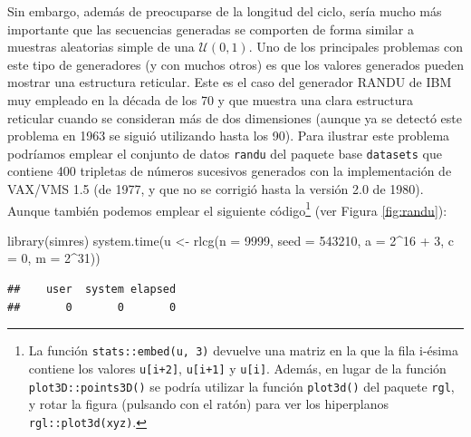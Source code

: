 \documentclass[
]{book}
\newenvironment{Shaded}{\begin{snugshade}}{\end{snugshade}}
\newcommand{\AttributeTok}[1]{\textcolor[rgb]{0.77,0.63,0.00}{#1}}
\newcommand{\DecValTok}[1]{\textcolor[rgb]{0.00,0.00,0.81}{#1}}
\newcommand{\FunctionTok}[1]{\textcolor[rgb]{0.00,0.00,0.00}{#1}}
\newcommand{\NormalTok}[1]{#1}
\newcommand{\OtherTok}[1]{\textcolor[rgb]{0.56,0.35,0.01}{#1}}
\newcommand{\SpecialCharTok}[1]{\textcolor[rgb]{0.00,0.00,0.00}{#1}}
\theoremstyle{break}
\theoremstyle{nonumberplain}
\begin{document}
Sin embargo, además de preocuparse de la longitud del ciclo, sería mucho más importante que las secuencias generadas se comporten de forma similar a muestras aleatorias simple de una \(\mathcal{U}(0,1)\).
Uno de los principales problemas con este tipo de generadores (y con muchos otros) es que los valores generados pueden mostrar una estructura reticular.
Este es el caso del generador RANDU de IBM muy empleado en la década de los 70 y que muestra una clara estructura reticular cuando se consideran más de dos dimensiones (aunque ya se detectó este problema en 1963 se siguió utilizando hasta los 90).
Para ilustrar este problema podríamos emplear el conjunto de datos \texttt{randu} del paquete base \texttt{datasets} que contiene 400 tripletas de números sucesivos generados con la implementación de VAX/VMS 1.5 (de 1977, y que no se corrigió hasta la versión 2.0 de 1980).
Aunque también podemos emplear el siguiente código\footnote{La función \texttt{stats::embed(u,\ 3)} devuelve una matriz en la que la fila i-ésima contiene los valores \texttt{u{[}i+2{]}}, \texttt{u{[}i+1{]}} y \texttt{u{[}i{]}}. Además, en lugar de la función \texttt{plot3D::points3D()} se podría utilizar la función \texttt{plot3d()} del paquete \texttt{rgl}, y rotar la figura (pulsando con el ratón) para ver los hiperplanos \texttt{rgl::plot3d(xyz)}.} (ver Figura \ref{fig:randu}):

\begin{Shaded}
\begin{Highlighting}[]
\FunctionTok{library}\NormalTok{(simres)}
\FunctionTok{system.time}\NormalTok{(u }\OtherTok{\textless{}{-}} \FunctionTok{rlcg}\NormalTok{(}\AttributeTok{n =} \DecValTok{9999}\NormalTok{, }
          \AttributeTok{seed =} \DecValTok{543210}\NormalTok{, }\AttributeTok{a =} \DecValTok{2}\SpecialCharTok{\^{}}\DecValTok{16} \SpecialCharTok{+} \DecValTok{3}\NormalTok{, }\AttributeTok{c =} \DecValTok{0}\NormalTok{, }\AttributeTok{m =} \DecValTok{2}\SpecialCharTok{\^{}}\DecValTok{31}\NormalTok{))}
\end{Highlighting}
\end{Shaded}

\begin{verbatim}
##    user  system elapsed 
##       0       0       0
\end{verbatim}
\end{document}
